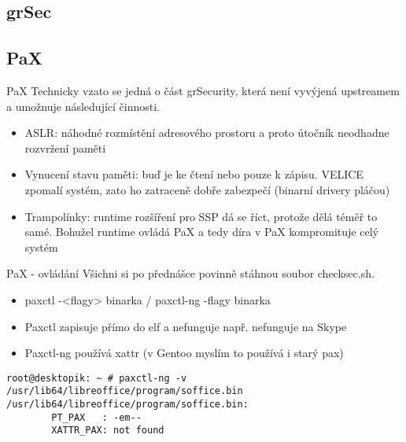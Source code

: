 \documentclass{beamer}
\begin{document}
\subsection{grSec}



\subsection{PaX}

\begin{frame}{PaX}
	Technicky vzato se jedná o část grSecurity, která není vyvýjená upstreamem a umožnuje následující činnosti.
	\begin{itemize}
		\item ASLR: náhodné rozmístění adresového prostoru a proto útočník neodhadne rozvržení paměti
		\item Vynucení stavu paměti: buď je ke čtení nebo pouze k zápisu. VELICE zpomalí systém, zato ho zatraceně dobře zabezpečí (binarní drivery pláčou)
		\item Trampolínky: runtime rozšíření pro SSP dá se říct, protože dělá téměř to samé. Bohužel runtime ovládá PaX a tedy díra v PaX kompromituje celý systém
	\end{itemize}
\end{frame}

\begin{frame}[fragile]{PaX - ovládání}
	Všichni si po přednášce povinně stáhnou soubor checksec.sh.
	\begin{itemize}
		\item paxctl -<flagy> binarka / paxctl-ng -flagy binarka
		\item Paxctl zapisuje přímo do elf a nefunguje např. nefunguje na Skype
		\item Paxctl-ng používá xattr (v Gentoo myslím to používá i starý pax)
	\end{itemize}
	\begin{tiny}
	\begin{verbatim}
root@desktopik: ~ # paxctl-ng -v /usr/lib64/libreoffice/program/soffice.bin
/usr/lib64/libreoffice/program/soffice.bin:
        PT_PAX   : -em--
        XATTR_PAX: not found
	\end{verbatim}
	\end{tiny}
\end{frame}
\end{document}
